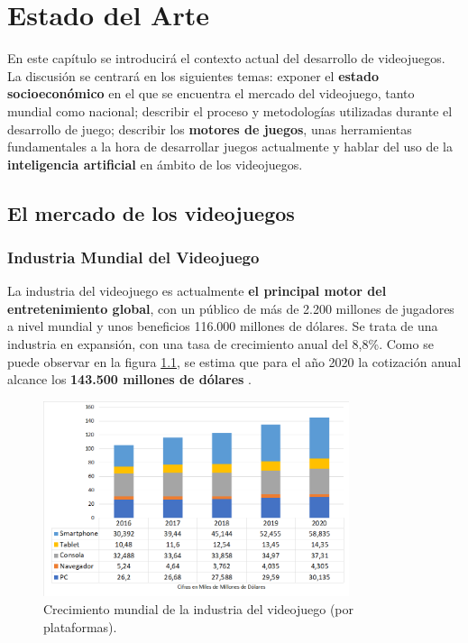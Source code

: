 \chapter{Estado del Arte}
\label{chap:estado del arte}
En este capítulo se introducirá el contexto actual del desarrollo de videojuegos. La discusión se centrará en los siguientes temas: exponer el \textbf{estado socioeconómico} en el que se encuentra el mercado del videojuego, tanto mundial como nacional; describir el proceso y metodologías utilizadas durante el desarrollo de juego; describir los \textbf{motores de juegos}, unas herramientas fundamentales a la hora de desarrollar juegos actualmente y hablar del uso de la \textbf{inteligencia artificial} en ámbito de los videojuegos.
 
\section{El mercado de los videojuegos}
\subsection{Industria Mundial del Videojuego}
La industria del videojuego es actualmente \textbf{el principal motor del entretenimiento global}, con un público de más de 2.200 millones de jugadores a nivel mundial y unos beneficios 116.000 millones de dólares. Se trata de una industria en expansión, con una tasa de crecimiento anual del 8,8\%. Como se puede observar en la figura \ref{crecimiento_mercado_plataforma}, se estima que para el año 2020 la cotización anual alcance los \textbf{143.500 millones de dólares} \cite{libro_blanco}.
\begin{figure}[!t]
    \centering
    \includegraphics[width=0.8\textwidth]{images/estadodelarte/mercado/crecimiento_mercado_plataforma}
    \caption{Crecimiento mundial de la industria del videojuego (por plataformas).}
    \label{crecimiento_mercado_plataforma}
\end{figure}

